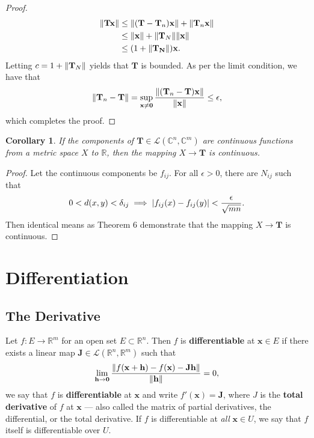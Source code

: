 \documentclass[11pt]{article}
\renewcommand{\vec}[1]{\mathbf{#1}}
\newcommand{\mat}[1]{\mathbf{#1}}
\newtheorem{corollary}{Corollary}
\begin{document}
\begin{adjustwidth}{0.5cm}{}
\begin{proof}
    \begin{align*}
      \norm{\mat{T} \vec{x}} & \le \norm{(\mat{T} - \mat{T}_{n}) \vec{x}} + \norm{\mat{T}_{n} \vec{x}} \\
                             & \le \norm{\vec{x}} + \norm{\mat{T}_{N}} \norm{\vec{x}} \\
                             & \le (1 + \norm{\mat{T_{N}}}) \vec{x}.
    \end{align*}
    Letting $c = 1 + \norm{\mat{T}_{N}}$ yields that $\mat{T}$ is bounded. As per the limit condition, we have that
    \[
      \norm{\mat{T}_{n} - \mat{T}} = \sup\limits_{\vec{x} \ne \vec{0}} \frac{\norm{(\mat{T}_{n} - \mat{T}) \vec{x}}}{\norm{\vec{x}}} \le \epsilon,
    \]
    which completes the proof.
  \end{proof}
\end{adjustwidth}

\begin{corollary}
	If the components of $\mat{T} \in \mathcal{L}(\mathbb{C}^{n}, \mathbb{C}^{m})$ are continuous functions from a metric space $X$ to $\mathbb{R}$, then the mapping $X \to \mat{T}$ is continuous.
\end{corollary}
\begin{adjustwidth}{0.5cm}{}
	\begin{proof}
		Let the continuous components be $f_{ij}$. For all $\epsilon > 0$, there are $N_{ij}$ such that
		\[
			0 < d(x, y) < \delta_{ij} \implies \abs{f_{ij}(x) - f_{ij}(y)} < \frac{\epsilon}{\sqrt{mn}}.
		\]
		Then identical means as Theorem 6 demonstrate that the mapping $X \to \mat{T}$ is continuous.
	\end{proof}
\end{adjustwidth}



\section{Differentiation}


\subsection{The Derivative}

Let $f : E \to \mathbb{R}^{m}$ for an open set $E \subset \mathbb{R}^{n}$. Then $f$ is \textbf{differentiable} at $\vec{x} \in E$ if there exists a linear map $\mat{J} \in \mathcal{L}(\mathbb{R}^{n}, \mathbb{R}^{m})$ such that
\[
	\lim\limits_{\vec{h} \to \vec{0}} \frac{\norm{f(\vec{x} + \vec{h}) - f(\vec{x}) - \mat{J}\vec{h}}}{\norm{\vec{h}}} = 0,
\] 
we say that $f$ is \textbf{differentiable} at $\vec{x}$ and write $f'(\vec{x}) = \mat{J}$, where $J$ is the \textbf{total derivative} of $f$ at $\vec{x}$ --- also called the matrix of partial derivatives, the differential, or the total derivative. If $f$ is differentiable at \textit{all} $\vec{x} \in U$, we say that $f$ itself is differentiable over $U$.
\end{document}
